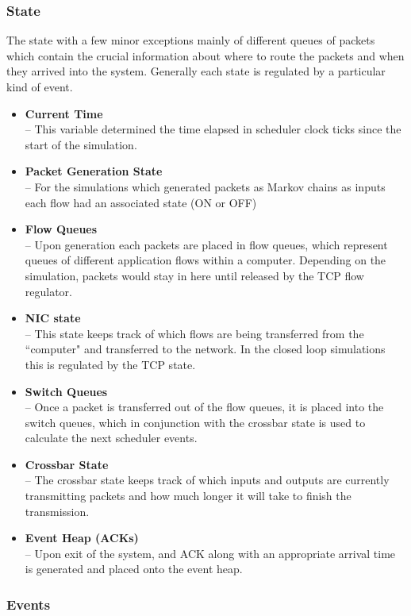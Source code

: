 \documentclass{IEEEtran}%
\begin{document}
 \subsubsection{State}
 
The state with a few minor exceptions mainly of different queues of packets which contain the crucial information about where to route the packets and when they arrived into the system.  Generally each state is regulated by a particular kind of event.
\begin{itemize}
\item {\bf Current Time}\\
 --  This variable determined the time elapsed in scheduler clock ticks since the start of the simulation.
\item {\bf Packet Generation State}\\
 --  For the simulations which generated packets as Markov chains as inputs each flow had an associated state (ON or OFF)
\item {\bf Flow Queues}\\
 --  Upon generation each packets are placed in flow queues, which represent queues of different application flows within a computer.  Depending on the simulation, packets would stay in here until released by the TCP flow regulator.
\item {\bf NIC state}\\
 --  This state keeps track of which flows are being transferred from the ``computer" and transferred to the network.  In the closed loop simulations this is regulated by the TCP state.
\item {\bf Switch Queues}\\
--  Once a packet is transferred out of the flow queues, it is placed into the switch queues, which in conjunction with the crossbar state is used to calculate the next scheduler events.
\item {\bf Crossbar State}\\
--  The crossbar state keeps track of which inputs and outputs are currently transmitting packets and how much longer it will take to finish the transmission.
\item {\bf Event Heap (ACKs)}\\
--  Upon exit of the system, and ACK along with an appropriate arrival time is generated and placed onto the event heap.  
\end{itemize}

\subsubsection{Events}
\end{document}
